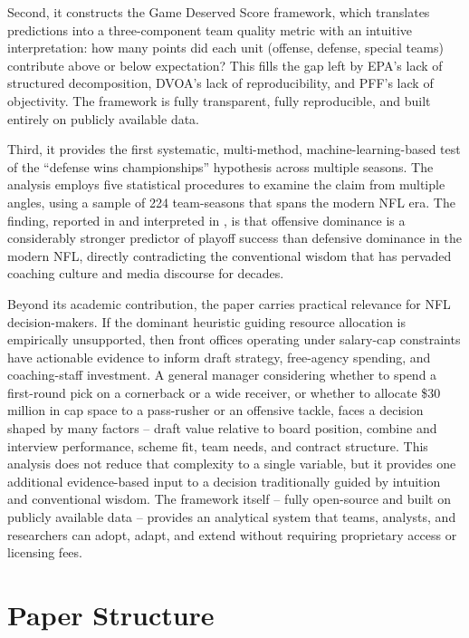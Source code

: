 Second, it constructs the Game Deserved Score framework, which translates \xscore{} predictions into a three-component team quality metric with an intuitive interpretation: how many points did each unit (offense, defense, special teams) contribute above or below expectation? This fills the gap left by EPA's lack of structured decomposition, DVOA's lack of reproducibility, and PFF's lack of objectivity. The \gds{} framework is fully transparent, fully reproducible, and built entirely on publicly available data.

Third, it provides the first systematic, multi-method, machine-learning-based test of the ``defense wins championships'' hypothesis across multiple seasons. The analysis employs five statistical procedures to examine the claim from multiple angles, using a sample of 224 team-seasons that spans the modern NFL era. The finding, reported in  and interpreted in , is that offensive dominance is a considerably stronger predictor of playoff success than defensive dominance in the modern NFL, directly contradicting the conventional wisdom that has pervaded coaching culture and media discourse for decades.

Beyond its academic contribution, the paper carries practical relevance for NFL decision-makers. If the dominant heuristic guiding resource allocation is empirically unsupported, then front offices operating under salary-cap constraints have actionable evidence to inform draft strategy, free-agency spending, and coaching-staff investment. A general manager considering whether to spend a first-round pick on a cornerback or a wide receiver, or whether to allocate \$30 million in cap space to a pass-rusher or an offensive tackle, faces a decision shaped by many factors  -- draft value relative to board position, combine and interview performance, scheme fit, team needs, and contract structure. This analysis does not reduce that complexity to a single variable, but it provides one additional evidence-based input to a decision traditionally guided by intuition and conventional wisdom. The framework itself  -- fully open-source and built on publicly available data \parencite{carl2021nflfastr}  -- provides an analytical system that teams, analysts, and researchers can adopt, adapt, and extend without requiring proprietary access or licensing fees.


\section{Paper Structure}
\label{sec:paper-structure}

